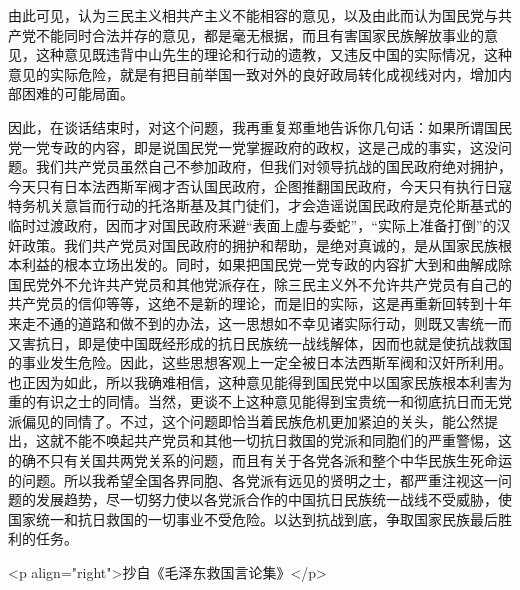 由此可见，认为三民主义相共产主义不能相容的意见，以及由此而认为国民党与共产党不能同时合法并存的意见，都是毫无根据，而且有害国家民族解放事业的意见，这种意见既违背中山先生的理论和行动的遗教，又违反中国的实际情况，这种意见的实际危险，就是有把目前举国一致对外的良好政局转化成视线对内，增加内部困难的可能局面。

因此，在谈话结束时，对这个问题，我再重复郑重地告诉你几句话：如果所谓国民党一党专政的内容，即是说国民党一党掌握政府的政权，这是己成的事实，这没问题。我们共产党员虽然自己不参加政府，但我们对领导抗战的国民政府绝对拥护，今天只有日本法西斯军阀才否认国民政府，企图推翻国民政府，今天只有执行日寇特务机关意旨而行动的托洛斯基及其门徒们，才会造谣说国民政府是克伦斯基式的临时过渡政府，因而才对国民政府釆避“表面上虚与委蛇”，“实际上准备打倒”的汉奸政策。我们共产党员对国民政府的拥护和帮助，是绝对真诚的，是从国家民族根本利益的根本立场出发的。同时，如果把国民党一党专政的内容扩大到和曲解成除国民党外不允许共产党员和其他党派存在，除三民主义外不允许共产党员有自己的共产党员的信仰等等，这绝不是新的理论，而是旧的实际，这是再重新回转到十年来走不通的道路和做不到的办法，这一思想如不幸见诸实际行动，则既又害统一而又害抗日，即是使中国既经形成的抗日民族统一战线解体，因而也就是使抗战救国的事业发生危险。因此，这些思想客观上一定全被日本法西斯军阀和汉奸所利用。也正因为如此，所以我确难相信，这种意见能得到国民党中以国家民族根本利害为重的有识之士的同情。当然，更谈不上这种意见能得到宝贵统一和彻底抗日而无党派偏见的同情了。不过，这个问题即恰当着民族危机更加紧迫的关头，能公然提出，这就不能不唤起共产党员和其他一切抗日救国的党派和同胞们的严重警惕，这的确不只有关国共两党关系的问题，而且有关于各党各派和整个中华民族生死命运的问题。所以我希望全国各界同胞、各党派有远见的贤明之士，都严重注视这一问题的发展趋势，尽一切努力使以各党派合作的中国抗日民族统一战线不受威胁，使国家统一和抗日救国的一切事业不受危险。以达到抗战到底，争取国家民族最后胜利的任务。

<p align="right">抄自《毛泽东救国言论集》</p>

